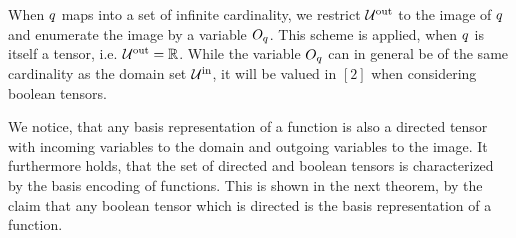 \begin{remark}
    When $q$ maps into a set of infinite cardinality, we restrict $\mathcal{U}^{\mathrm{out}}$ to the image of $q$ and enumerate the image by a variable $O_{q}$.
    This scheme is applied, when $q$ is itself a tensor, i.e. $\mathcal{U}^{\mathrm{out}}=\mathbb{R}$.
    While the variable $O_{q}$ can in general be of the same cardinality as the domain set $\mathcal{U}^{\mathrm{in}}$, it will be valued in $[2]$ when considering boolean tensors.
\end{remark}

We notice, that any basis representation of a function is also a directed tensor with incoming variables to the domain and outgoing variables to the image.
It furthermore holds, that the set of directed and boolean tensors is characterized by the basis encoding of functions.
This is shown in the next theorem, by the claim that any boolean tensor which is directed is the basis representation of a function.

